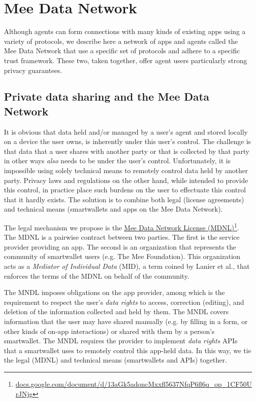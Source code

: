 \documentclass[11pt, oneside]{article}   	%
\newcommand{\hyperfootnote}[1][]{\def\ArgI{{#1}}\hyperfootnoteRelay}
\newcommand\hyperfootnoteRelay[2][]{\href{#1#2}{\ArgI}\footnote{\href{#1#2}{#2}}}
\begin{document}
\section{Mee Data Network}\label{sec:MDN2} %

Although agents can form connections with many kinds of existing apps using a variety of protocols, we describe here a network of apps and agents called the Mee Data Network that use a specific set of protocols and adhere to a specific trust framework. These two, taken together, offer agent users particularly strong privacy guarantees.

\subsection{Private data sharing and the Mee Data Network}

It is obvious that data held and/or managed by a user's agent and stored locally on a device the user owns, is inherently under this user's control. The challenge is that data that a user shares with another party or that is collected by that party in other ways \emph{also} needs to be under the user's control. Unfortunately, it is impossible using solely technical means to remotely control data held by another party. Privacy laws and regulations on the other hand, while intended to provide this control, in practice place such burdens on the user to effectuate this control that it hardly exists. The solution is to combine both legal (license agreements) and technical means (smartwallets and apps on the Mee Data Network). 

The legal mechanism we propose is the \hyperfootnote[Mee Data Network License (MDNL)][https://]{docs.google.com/document/d/13aGk5adoncMxxfl5637NfqP6fl6q\_op\_1CF50UrJNjg}. The MDNL is a pairwise contract between two parties. The first is the service provider providing an app. The second is an organization that represents the community of smartwallet users (e.g. The Mee Foundation). This organization acts as a \emph{Mediator of Individual Data} (MID), a term coined by Lanier et al.\cite{Lanier2018}, that enforces the terms of the MDNL on behalf of the community. 

The MNDL imposes obligations on the app provider, among which is the requirement to respect the user's \emph{data rights} to access, correction (editing), and deletion of the information collected and held by them. The MNDL covers information that the user may have shared manually (e.g. by filling in a form, or other kinds of on-app interactions) or shared with them by a person's smartwallet. The MNDL requires the provider to implement \emph{data rights} APIs that a smartwallet uses to remotely control this app-held data. In this way, we tie the legal (MDNL) and technical means (smartwallets and APIs) together.
\end{document}
